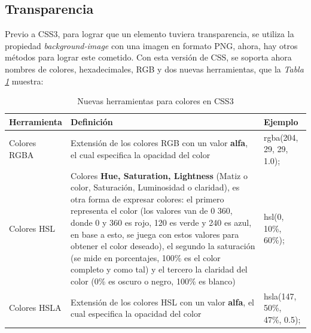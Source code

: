 \subsection{Transparencia}

Previo a CSS3, para lograr que un elemento tuviera transparencia, se utiliza la propiedad \textit{background-image} con una imagen en formato PNG, ahora, hay otros métodos para lograr este cometido. Con esta versión de CSS, se soporta ahora nombres de colores, hexadecimales, RGB y dos nuevas herramientas, que la \textit{Tabla \ref{tab: 4}} muestra:
\begin{table}[H]
    \centering
    \caption{Nuevas herramientas para colores en CSS3}
    \label{tab: 4}
    \begin{tabular}{m{3cm} m{8cm} m{4cm}}
        \hline
        \textbf{Herramienta} & \textbf{Definición} & \textbf{Ejemplo} \\
        \hline
        \parbox{3cm}{Colores RGBA}    & \parbox{8cm}{Extensión de los colores RGB con un valor \textbf{alfa}, el cual especifica la opacidad del color} & \parbox{4cm}{ rgba(204, 29, 29, 1.0); } \\
        \hline
        \parbox{3cm}{Colores HSL}     & \parbox{8cm}{Colores \textbf{Hue, Saturation, Lightness} (Matiz o color, Saturación, Luminosidad o claridad), es otra forma de expresar colores: el primero representa el color (los valores van de 0  360, donde 0 y 360 es rojo, 120 es verde y 240 es azul, en base a esto, se juega con estos valores para obtener el color deseado), el segundo la saturación (se mide en porcentajes, 100\% es el color completo y como tal) y el tercero la claridad del color (0\% es oscuro o negro, 100\% es blanco)} & \parbox{4cm}{ hsl(0, 10\%, 60\%); } \\
        \hline
        \parbox{3cm}{Colores HSLA}    & \parbox{8cm}{Extensión de los colores HSL con un valor \textbf{alfa}, el cual especifica la opacidad del color} & \parbox{4cm}{ hsla(147, 50\%,\\ 47\%, 0.5); } \\
        \hline
    \end{tabular}
\end{table}

